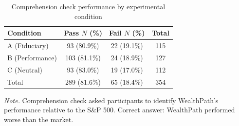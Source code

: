 \begin{table}[htbp]
\centering
\small
\caption{Comprehension check performance by experimental condition}
\label{tab:comprehension}
\begin{tabular}{lccc}
\toprule
Condition & Pass $N$ (\%) & Fail $N$ (\%) & Total \\
\midrule
A (Fiduciary)    & 93 (80.9\%)  & 22 (19.1\%) & 115 \\
B (Performance)  & 103 (81.1\%) & 24 (18.9\%) & 127 \\
C (Neutral)      & 93 (83.0\%)  & 19 (17.0\%) & 112 \\
\midrule
Total            & 289 (81.6\%) & 65 (18.4\%) & 354 \\
\bottomrule
\end{tabular}
\begin{flushleft}
\footnotesize
\textit{Note.} Comprehension check asked participants to identify WealthPath's performance relative to the S\&P 500. Correct answer: WealthPath performed worse than the market.
\end{flushleft}
\end{table}
